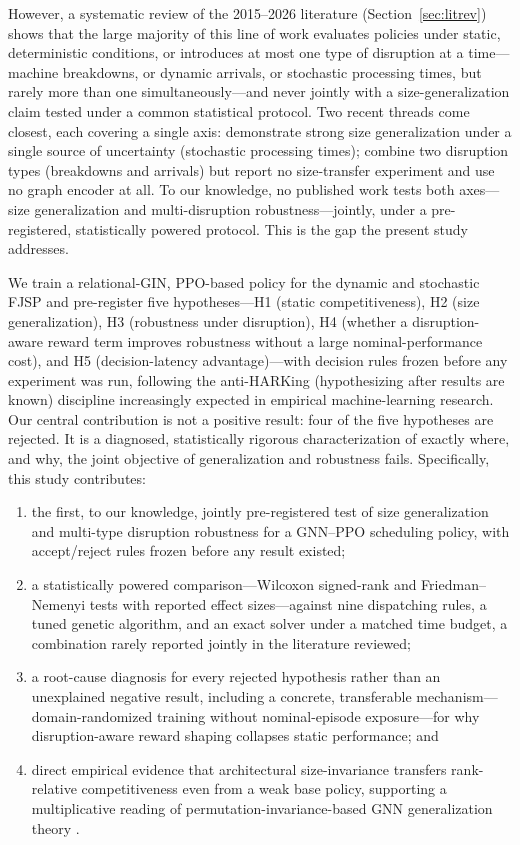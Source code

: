 \documentclass[11pt]{article}
\begin{document}
However, a systematic review of the 2015--2026 literature (Section~\ref{sec:litrev}) shows that the large majority of this line of work evaluates policies under static, deterministic conditions, or introduces at most one type of disruption at a time---machine breakdowns, or dynamic arrivals, or stochastic processing times, but rarely more than one simultaneously---and never jointly with a size-generalization claim tested under a common statistical protocol. Two recent threads come closest, each covering a single axis: \citet{smit2025spmdan} demonstrate strong size generalization under a single source of uncertainty (stochastic processing times); \citet{lassoued2026} combine two disruption types (breakdowns and arrivals) but report no size-transfer experiment and use no graph encoder at all. To our knowledge, no published work tests both axes---size generalization and multi-disruption robustness---jointly, under a pre-registered, statistically powered protocol. This is the gap the present study addresses.

We train a relational-GIN, PPO-based policy for the dynamic and stochastic FJSP and pre-register five hypotheses---H1 (static competitiveness), H2 (size generalization), H3 (robustness under disruption), H4 (whether a disruption-aware reward term improves robustness without a large nominal-performance cost), and H5 (decision-latency advantage)---with decision rules frozen before any experiment was run, following the anti-HARKing (hypothesizing after results are known) discipline increasingly expected in empirical machine-learning research. Our central contribution is not a positive result: four of the five hypotheses are rejected. It is a diagnosed, statistically rigorous characterization of exactly where, and why, the joint objective of generalization and robustness fails. Specifically, this study contributes:

\begin{enumerate}
  \item[(i)] the first, to our knowledge, jointly pre-registered test of size generalization and multi-type disruption robustness for a GNN--PPO scheduling policy, with accept/reject rules frozen before any result existed;
  \item[(ii)] a statistically powered comparison---Wilcoxon signed-rank and Friedman--Nemenyi tests with reported effect sizes---against nine dispatching rules, a tuned genetic algorithm, and an exact solver under a matched time budget, a combination rarely reported jointly in the literature reviewed;
  \item[(iii)] a root-cause diagnosis for every rejected hypothesis rather than an unexplained negative result, including a concrete, transferable mechanism---domain-randomized training without nominal-episode exposure---for why disruption-aware reward shaping collapses static performance; and
  \item[(iv)] direct empirical evidence that architectural size-invariance transfers rank-relative competitiveness even from a weak base policy, supporting a multiplicative reading of permutation-invariance-based GNN generalization theory \citep{xu2019gin}.
\end{enumerate}
\end{document}
